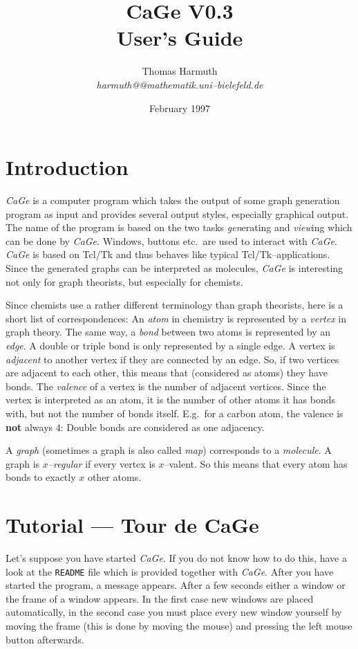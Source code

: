 \documentclass[a4paper]{article}
\title{CaGe V0.3\\User's Guide}
\author{Thomas Harmuth\\\textit{harmuth@@mathematik.uni--bielefeld.de}}
\date{February 1997}
\def\CaGe{\textit{CaGe}}
\begin{document}
\maketitle
\tableofcontents

\section{Introduction}
\CaGe{} is a computer program which takes the output of
some graph generation program as input and provides several output
styles, especially graphical output. The name of the program is based
on the two tasks \textit{gen}erating and \textit{view}ing which can be
done by \CaGe{}. Windows, buttons etc.~are used to 
interact with \CaGe{}. \CaGe{} is based on Tcl/Tk and
thus behaves like typical Tcl/Tk--applications. Since the generated graphs
can be interpreted as molecules, \CaGe{} is interesting not only for 
graph theorists, but especially for chemists.

Since chemists use a rather different terminology than graph theorists, here
is a short list of correspondences: An \textit{atom} in chemistry is 
represented by a \textit{vertex} in graph theory. The same way, a \textit{bond}
between two atoms is represented by an \textit{edge}. 
A double or triple bond is only represented by a single edge. A vertex is
\textit{adjacent} to another vertex if they are connected by an edge.
So, if two vertices are adjacent to each other, this means that (considered
as atoms) they have bonds. The \textit{valence} of a vertex is the number of 
adjacent vertices. Since the vertex is interpreted as an atom, it is the 
number of other atoms it has bonds with, but not the number of bonds itself.
E.g.~for a carbon atom, the valence is
\textbf{not} always 4: Double bonds are considered as one adjacency.

A \textit{graph} (sometimes a graph is also called \textit{map})
corresponds to a \textit{molecule}. A graph is 
\textit{$x$--regular} if every vertex is $x$--valent. So this means that every
atom has bonds to exactly $x$ other atoms.

\section{Tutorial --- Tour de CaGe}

Let's suppose you have started \CaGe{}. If you do not know how to do
this, have a look at the \texttt{README} file which is provided together
with \CaGe{}. After you have started the program, a message appears.
After a few seconds either a window or the frame of a window appears. In the
first case new windows are placed automatically, in the second case you must
place every new window yourself by moving the frame (this is done by moving
the mouse) and pressing the left mouse button afterwards. 
\end{document}
